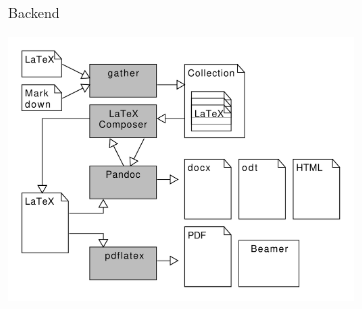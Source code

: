 \documentclass[english,hangout]{beamer}
\begin{document}
\begin{frame}{Backend}
\begin{center}
\includegraphics[height=7cm]{backend.pdf}
\end{center}
\vspace{-6mm}
\end{frame}
\end{document}

